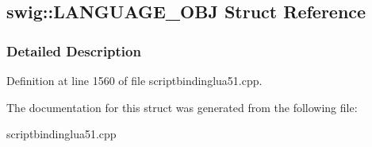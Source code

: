 \hypertarget{structswig_1_1LANGUAGE__OBJ}{
\subsection{swig::LANGUAGE\_\-OBJ Struct Reference}
\label{structswig_1_1LANGUAGE__OBJ}
}


\subsubsection{Detailed Description}


Definition at line 1560 of file scriptbindinglua51.cpp.



The documentation for this struct was generated from the following file:\begin{DoxyCompactItemize}
\item 
scriptbindinglua51.cpp\end{DoxyCompactItemize}
